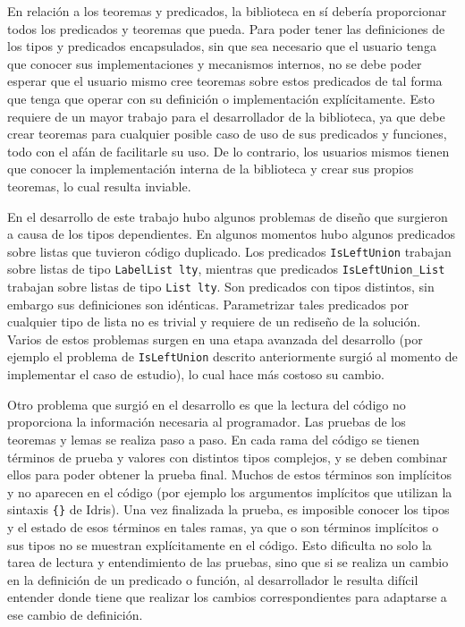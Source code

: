 En relación a los teoremas y predicados, la biblioteca en sí debería proporcionar todos los predicados y teoremas que pueda. Para poder tener las definiciones de los tipos y predicados encapsulados, sin que sea necesario que el usuario tenga que conocer sus implementaciones y mecanismos internos, no se debe poder esperar que el usuario mismo cree teoremas sobre estos predicados de tal forma que tenga que operar con su definición o implementación explícitamente. Esto requiere de un mayor trabajo para el desarrollador de la biblioteca, ya que debe crear teoremas para cualquier posible caso de uso de sus predicados y funciones, todo con el afán de facilitarle su uso. De lo contrario, los usuarios mismos tienen que conocer la implementación interna de la biblioteca y crear sus propios teoremas, lo cual resulta inviable.

En el desarrollo de este trabajo hubo algunos problemas de diseño que surgieron a causa de los tipos dependientes. En algunos momentos hubo algunos predicados sobre listas que tuvieron código duplicado. Los predicados \texttt{IsLeftUnion} trabajan sobre listas de tipo \texttt{LabelList lty}, mientras que predicados \texttt{IsLeftUnion\_List} trabajan sobre listas de tipo \texttt{List lty}. Son predicados con tipos distintos, sin embargo sus definiciones son idénticas. Parametrizar tales predicados por cualquier tipo de lista no es trivial y requiere de un rediseño de la solución. Varios de estos problemas surgen en una etapa avanzada del desarrollo (por ejemplo el problema de \texttt{IsLeftUnion} descrito anteriormente surgió al momento de implementar el caso de estudio), lo cual hace más costoso su cambio.

Otro problema que surgió en el desarrollo es que la lectura del código no proporciona la información necesaria al programador. Las pruebas de los teoremas y lemas se realiza paso a paso. En cada rama del código se tienen términos de prueba y valores con distintos tipos complejos, y se deben combinar ellos para poder obtener la prueba final. Muchos de estos términos son implícitos y no aparecen en el código (por ejemplo los argumentos implícitos que utilizan la sintaxis \texttt{\{\}} de Idris). Una vez finalizada la prueba, es imposible conocer los tipos y el estado de esos términos en tales ramas, ya que o son términos implícitos o sus tipos no se muestran explícitamente en el código. Esto dificulta no solo la tarea de lectura y entendimiento de las pruebas, sino que si se realiza un cambio en la definición de un predicado o función, al desarrollador le resulta difícil entender donde tiene que realizar los cambios correspondientes para adaptarse a ese cambio de definición.

